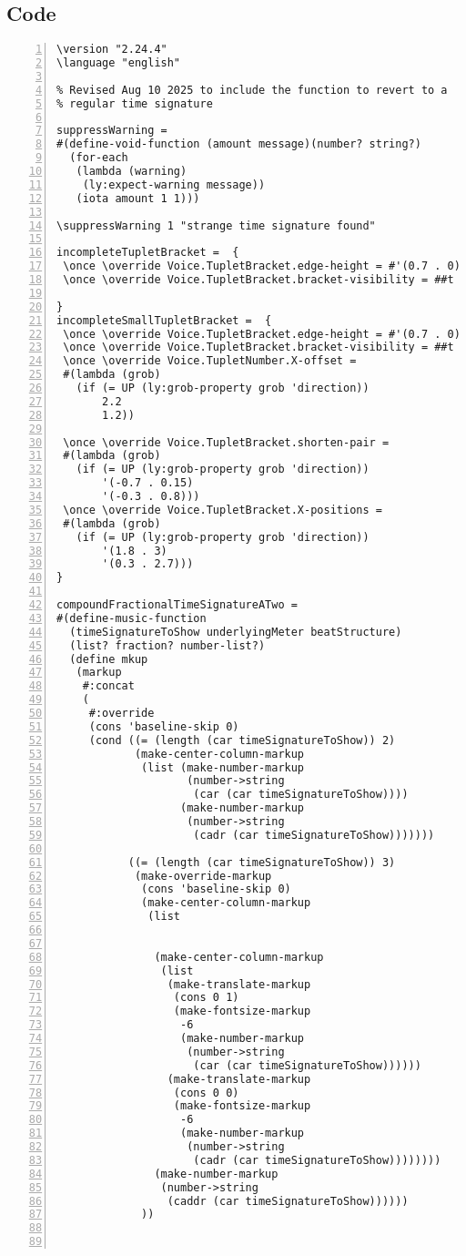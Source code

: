 \subsection{Code}
\begin{Verbatim}[numbers=left,xleftmargin=5mm]
\version "2.24.4"
\language "english"

% Revised Aug 10 2025 to include the function to revert to a
% regular time signature

suppressWarning =
#(define-void-function (amount message)(number? string?)
  (for-each
   (lambda (warning)
    (ly:expect-warning message))
   (iota amount 1 1)))

\suppressWarning 1 "strange time signature found"

incompleteTupletBracket =  {
 \once \override Voice.TupletBracket.edge-height = #'(0.7 . 0)
 \once \override Voice.TupletBracket.bracket-visibility = ##t

}
incompleteSmallTupletBracket =  {
 \once \override Voice.TupletBracket.edge-height = #'(0.7 . 0)
 \once \override Voice.TupletBracket.bracket-visibility = ##t
 \once \override Voice.TupletNumber.X-offset =
 #(lambda (grob)
   (if (= UP (ly:grob-property grob 'direction))
       2.2
       1.2))

 \once \override Voice.TupletBracket.shorten-pair =
 #(lambda (grob)
   (if (= UP (ly:grob-property grob 'direction))
       '(-0.7 . 0.15)
       '(-0.3 . 0.8)))
 \once \override Voice.TupletBracket.X-positions =
 #(lambda (grob)
   (if (= UP (ly:grob-property grob 'direction))
       '(1.8 . 3)
       '(0.3 . 2.7)))
}

compoundFractionalTimeSignatureATwo =
#(define-music-function
  (timeSignatureToShow underlyingMeter beatStructure)
  (list? fraction? number-list?)
  (define mkup
   (markup
    #:concat
    (
     #:override
     (cons 'baseline-skip 0)
     (cond ((= (length (car timeSignatureToShow)) 2)
            (make-center-column-markup
             (list (make-number-markup
                    (number->string
                     (car (car timeSignatureToShow))))
                   (make-number-markup
                    (number->string
                     (cadr (car timeSignatureToShow)))))))

           ((= (length (car timeSignatureToShow)) 3)
            (make-override-markup
             (cons 'baseline-skip 0)
             (make-center-column-markup
              (list


               (make-center-column-markup
                (list
                 (make-translate-markup
                  (cons 0 1)
                  (make-fontsize-markup
                   -6
                   (make-number-markup
                    (number->string
                     (car (car timeSignatureToShow))))))
                 (make-translate-markup
                  (cons 0 0)
                  (make-fontsize-markup
                   -6
                   (make-number-markup
                    (number->string
                     (cadr (car timeSignatureToShow))))))))
               (make-number-markup
                (number->string
                 (caddr (car timeSignatureToShow))))))
             ))



\end{Verbatim}
